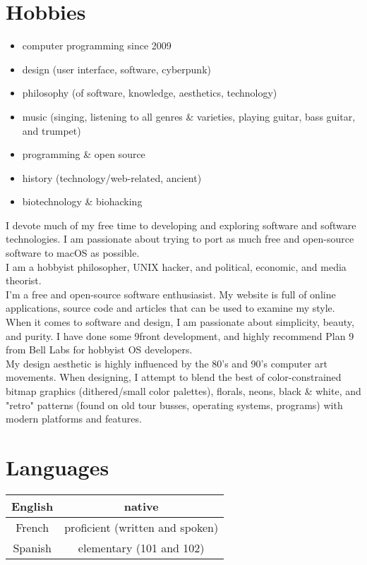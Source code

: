 \documentclass[11pt]{article}
\begin{document}
\section*{Hobbies}
\begin{itemize}
	\item computer programming since 2009
    \item design (user interface, software, cyberpunk)
    \item philosophy (of software, knowledge, aesthetics, technology)
    \item music (singing, listening to all genres \& varieties, playing guitar, bass guitar, and trumpet)
    \item programming \& open source
    \item history (technology/web-related, ancient)
    \item biotechnology \& biohacking
\end{itemize}

I devote much of my free time to developing and exploring software and software technologies. I am passionate about trying to port as much free and open-source software to macOS as possible.\\

I am a hobbyist philosopher, UNIX hacker, and political, economic, and media theorist.\\

I'm a free and open-source software enthusiasist. My website is full of online applications, source code and articles that can be used to examine my style.\\

When it comes to software and design, I am passionate about simplicity, beauty, and purity. I have done some 9front development, and highly recommend Plan 9 from Bell Labs for hobbyist OS developers.\\

My design aesthetic is highly influenced by the 80's and 90's computer art movements. When designing, I attempt to blend the best of color-constrained bitmap graphics (dithered/small color palettes), florals, neons, black \& white, and "retro" patterns (found on old tour busses, operating systems, programs) with modern platforms and features. 

\section*{Languages}
\begin{tabular}{ | c | c | }
 \hline
 English & native  \\ 
 \hline
 French & proficient (written and spoken) \\  
 \hline
 Spanish & elementary (101 and 102) \\
 \hline
\end{tabular}
\end{document}
